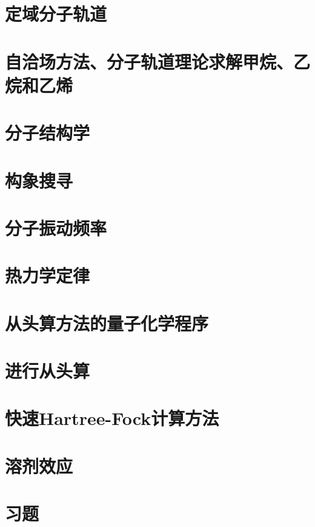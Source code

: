\section{定域分子轨道}
\label{sec:15.8 Localized Molecular Orbitals}

\section{自洽场方法、分子轨道理论求解甲烷、乙烷和乙烯}
\label{sec:15.9 The SCF MO Treatment of Methane, Ethane, and Ethylene}

\section{分子结构学}
\label{sec:15.10 Molecular Geometry}

\section{构象搜寻}
\label{sec:15.11 Conformational Searching}

\section{分子振动频率}
\label{sec:15.12 Molecular Vibration Frequencies}

\section{热力学定律}
\label{sec:15.13 Thermodynamic Properties}

\section{从头算方法的量子化学程序}
\label{sec:15.14 Ab Initio Quantum Chemistry Programs}

\section{进行从头算}
\label{sec:15.15 Performing Ab Initio Calculations}

\section{快速Hartree-Fock计算方法}
\label{sec:15.16 Speeding Up Hartree-Fock Methods}

\section{溶剂效应}
\label{sec:15.17 Solvent Effects}

\section*{习题}